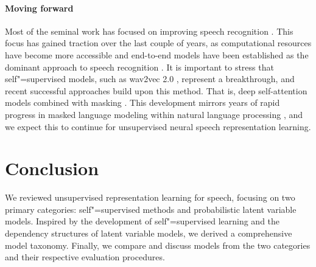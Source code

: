 {\paragraph{Moving forward} 
Most of the seminal work has focused on improving speech recognition \parencite{schneider_wav2vec_2019, baevski_wav2vec_2020}. This focus has gained traction over the last couple of years, as computational resources have become more accessible and end-to-end models \parencite{graves_connectionist_2006, chan_listen_2016} have been established as the dominant approach to speech recognition \parencite{gulati_conformer_2020}. It is important to stress that self"=supervised models, such as wav2vec 2.0 \parencite{baevski_wav2vec_2020}, represent a breakthrough, and recent successful approaches build upon this method. That is, deep self-attention models combined with masking \parencite{hsu_hubert_2021, wang_unispeech_2021, chen_wavlm_2021}. This development mirrors years of rapid progress in masked language modeling within natural language processing \parencite{devlin_bert_2018,clark_electra_2020}, and we expect this to continue for unsupervised neural speech representation learning.

\section{Conclusion}
\label{sec:conc}
We reviewed unsupervised representation learning for speech, focusing on two primary categories: self"=supervised methods and probabilistic latent variable models. Inspired by the development of self"=supervised learning and the dependency structures of latent variable models, we derived a comprehensive model taxonomy. Finally, we compare and discuss models from the two categories and their respective evaluation procedures.

}

